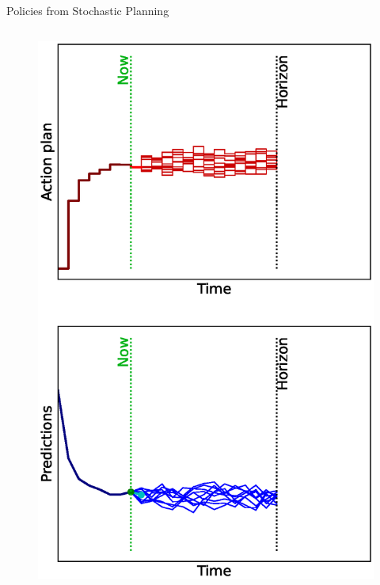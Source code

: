 \documentclass[lecture]{beamer}
\begin{document}
\begin{frame}{\normalsize Policies from Stochastic Planning}
\begin{columns}
\begin{overlayarea}{\textwidth}{0.9\textheight}
\begin{figure}
{          \includegraphics[width=\FS\textwidth,clip]{Codes/MPC/MPCMCWRONG7.eps}
        }%
        \end{figure}
        \end{overlayarea}
        



\end{columns}
\end{frame}
\end{document}
